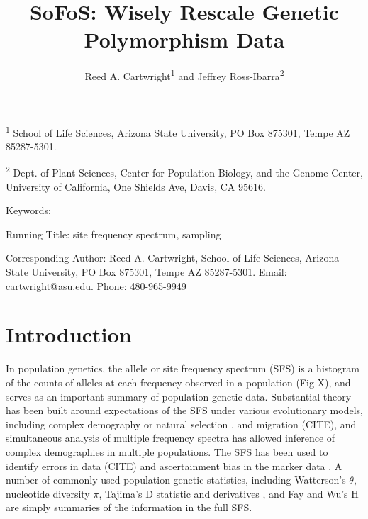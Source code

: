 \documentclass[11pt,letterpaper]{article}
\title{SoFoS: Wisely Rescale Genetic Polymorphism Data}
\author{Reed A. Cartwright\textsuperscript{1} and %
Jeffrey Ross-Ibarra\textsuperscript{2}%
}
\date{}
\begin{document}
\maketitle

\noindent%
\textsuperscript{1}%
School of Life Sciences, Arizona State University, PO Box 875301, Tempe AZ 85287-5301. %

\noindent
\textsuperscript{2}%
Dept. of Plant Sciences, Center for Population Biology, and the Genome Center, University of California, One Shields Ave, Davis, CA 95616.

Keywords:

Running Title: site frequency spectrum, sampling %

Corresponding Author: Reed A. Cartwright, School of Life Sciences, Arizona State University, PO Box 875301, Tempe AZ 85287-5301.  Email: cartwright@asu.edu.  Phone: 480-965-9949


\newpage
\linenumbers

\section{Introduction}

In population genetics, the allele or site frequency spectrum (SFS) is a histogram of the counts of alleles at each frequency observed in a population (Fig X), and serves as an important summary of population genetic data.   Substantial theory has been built around expectations of the SFS under various evolutionary models, including complex demography \citep{Gutenkunst2009} or natural selection \citep{Nielsen2005a}, and migration (CITE), and simultaneous analysis of multiple frequency spectra has allowed inference of complex demographies in multiple populations. The SFS has been used to identify errors in data (CITE) and ascertainment bias in the marker data \citep{Nielsen2004}.  A number of commonly used population genetic statistics, including Watterson's \citep{Watterson1975} $\theta$, nucleotide diversity $\pi$, Tajima's \citep{Tajima1989} D statistic and derivatives \citep{Fu1993}, and Fay and Wu's H \citep{Fay2000} %
are simply summaries of the information in the full SFS.
\end{document}
